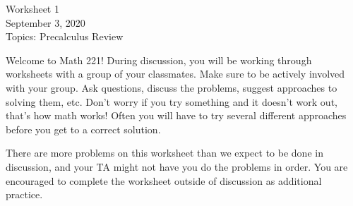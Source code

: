\documentclass[a4paper,10pt]{article}
\begin{document}
\vspace{-0.5in}
\begin{center}
Worksheet 1\\
September 3, 2020\\
 Topics: Precalculus Review 
\end{center}
\vspace{.2in}

\noindent Welcome to Math 221! During discussion, you will be working through worksheets with a group of your classmates. Make sure to be actively involved with your group. Ask questions, discuss the problems, suggest approaches to solving them, etc. Don't worry if you try something and it doesn't work out, that's how math works! Often you will have to try several different approaches before you get to a correct solution.

\medskip

 There are more problems on this worksheet than we expect to be done in discussion, and your TA might not have you do the problems in order.  You are encouraged to  complete the worksheet outside of discussion as additional practice.  

\medskip
\end{document}
